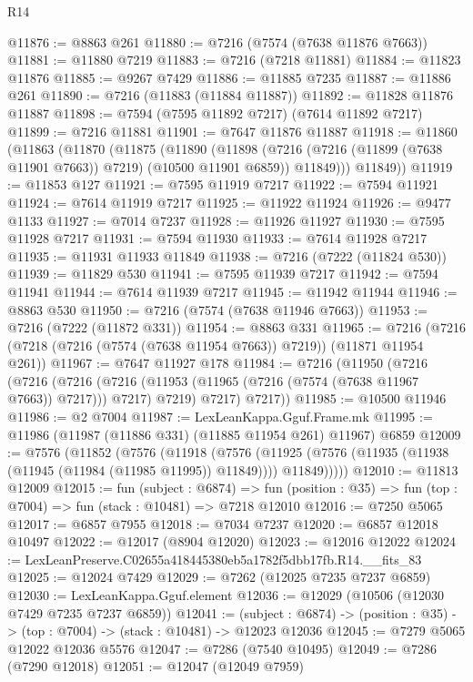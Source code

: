 \begin{lexlean}{R14}
\begin{coremodule}
@11876 := @8863 @261
@11880 := @7216 (@7574 (@7638 @11876 @7663))
@11881 := @11880 @7219
@11883 := @7216 (@7218 @11881)
@11884 := @11823 @11876
@11885 := @9267 @7429
@11886 := @11885 @7235
@11887 := @11886 @261
@11890 := @7216 (@11883 (@11884 @11887))
@11892 := @11828 @11876 @11887
@11898 := @7594 (@7595 @11892 @7217) (@7614 @11892 @7217)
@11899 := @7216 @11881
@11901 := @7647 @11876 @11887
@11918 := @11860
    (@11863
      (@11870
        (@11875
          (@11890
            (@11898
              (@7216 (@7216 (@11899 (@7638 @11901 @7663)) @7219) (@10500 @11901 @6859))
              @11849)))
        @11849))
@11919 := @11853 @127
@11921 := @7595 @11919 @7217
@11922 := @7594 @11921
@11924 := @7614 @11919 @7217
@11925 := @11922 @11924
@11926 := @9477 @1133
@11927 := @7014 @7237
@11928 := @11926 @11927
@11930 := @7595 @11928 @7217
@11931 := @7594 @11930
@11933 := @7614 @11928 @7217
@11935 := @11931 @11933 @11849
@11938 := @7216 (@7222 (@11824 @530))
@11939 := @11829 @530
@11941 := @7595 @11939 @7217
@11942 := @7594 @11941
@11944 := @7614 @11939 @7217
@11945 := @11942 @11944
@11946 := @8863 @530
@11950 := @7216 (@7574 (@7638 @11946 @7663))
@11953 := @7216 (@7222 (@11872 @331))
@11954 := @8863 @331
@11965 := @7216 (@7216 (@7218 (@7216 (@7574 (@7638 @11954 @7663)) @7219)) (@11871 @11954 @261))
@11967 := @7647 @11927 @178
@11984 := @7216
    (@11950
      (@7216
        (@7216
          (@7216 (@7216 (@11953 (@11965 (@7216 (@7574 (@7638 @11967 @7663)) @7217))) @7217) @7219)
          @7217)
        @7217))
@11985 := @10500 @11946
@11986 := @2 @7004
@11987 := LexLeanKappa.Gguf.Frame.mk
@11995 := @11986 (@11987 (@11886 @331) (@11885 @11954 @261) @11967) @6859
@12009 := @7576
    (@11852
      (@7576
        (@11918
          (@7576
            (@11925 (@7576 (@11935 (@11938 (@11945 (@11984 (@11985 @11995)) @11849)))) @11849)))))
@12010 := @11813 @12009
@12015 := fun (subject : @6874) =>
  fun (position : @35) => fun (top : @7004) => fun (stack : @10481) => @7218 @12010
@12016 := @7250 @5065
@12017 := @6857 @7955
@12018 := @7034 @7237
@12020 := @6857 @12018 @10497
@12022 := @12017 (@8904 @12020)
@12023 := @12016 @12022
@12024 := LexLeanPreserve.C02655a418445380eb5a1782f5dbb17fb.R14.__fits_83
@12025 := @12024 @7429
@12029 := @7262 (@12025 @7235 @7237 @6859)
@12030 := LexLeanKappa.Gguf.element
@12036 := @12029 (@10506 (@12030 @7429 @7235 @7237 @6859))
@12041 := (subject : @6874) ->
  (position : @35) -> (top : @7004) -> (stack : @10481) -> @12023 @12036
@12045 := @7279 @5065 @12022 @12036 @5576
@12047 := @7286 (@7540 @10495)
@12049 := @7286 (@7290 @12018)
@12051 := @12047 (@12049 @7959)

\end{coremodule}
\end{lexlean}
